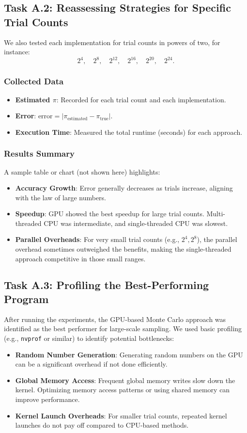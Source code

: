 \documentclass[12pt]{article}
\begin{document}
\subsection{Task A.2: Reassessing Strategies for Specific Trial Counts}
We also tested each implementation for trial counts in powers of two, for
instance:
\[
    2^4, \quad 2^8, \quad 2^{12}, \quad 2^{16}, \quad 2^{20}, \quad 2^{24}.
\]
\subsubsection{Collected Data}
\begin{itemize}
    \item \textbf{Estimated \(\pi\)}: Recorded for each trial count and each implementation.
    \item \textbf{Error}: \( \text{error} = \bigl|\pi_{\text{estimated}} - \pi_{\text{true}}\bigr| \).
    \item \textbf{Execution Time}: Measured the total runtime (seconds) for each approach.
\end{itemize}

\subsubsection{Results Summary}
A sample table or chart (not shown here) highlights:
\begin{itemize}
    \item \textbf{Accuracy Growth}: Error generally decreases as trials increase, aligning with
          the law of large numbers.
    \item \textbf{Speedup}: GPU showed the best speedup for large trial counts. Multi-threaded
          CPU was intermediate, and single-threaded CPU was slowest.
    \item \textbf{Parallel Overheads}: For very small trial counts (e.g., \(2^4, 2^8\)), the
          parallel overhead sometimes outweighed the benefits, making the single-threaded
          approach competitive in those small ranges.
\end{itemize}

\subsection{Task A.3: Profiling the Best-Performing Program}
After running the experiments, the GPU-based Monte Carlo approach was
identified as the best performer for large-scale sampling. We used basic
profiling (e.g., \texttt{nvprof} or similar) to identify potential bottlenecks:
\begin{itemize}
    \item \textbf{Random Number Generation}: Generating random numbers on the GPU can be a
          significant overhead if not done efficiently.
    \item \textbf{Global Memory Access}: Frequent global memory writes slow down the kernel.
          Optimizing memory access patterns or using shared memory can improve performance.
    \item \textbf{Kernel Launch Overheads}: For smaller trial counts, repeated kernel launches
          do not pay off compared to CPU-based methods.
\end{itemize}
\end{document}
